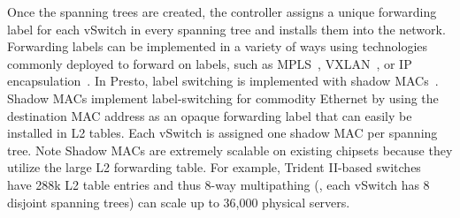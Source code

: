 Once the spanning trees are created, the controller assigns a unique forwarding label
for each vSwitch in every spanning tree and installs them into the network.
Forwarding labels can be implemented in a variety of ways using
technologies commonly deployed to forward on labels,
such as MPLS~\cite{casado2012fabric}, VXLAN~\cite{conga,nv-mtd}, or IP encapsulation~\cite{drb}. 
In Presto,
label switching is implemented with shadow MACs~\cite{shadow-mac}. 
Shadow MACs implement label-switching for commodity Ethernet by using the 
destination MAC address as an opaque forwarding label that can easily be 
installed in L2 tables. 
Each vSwitch is assigned one shadow MAC per spanning tree.
Note Shadow MACs are extremely scalable on
existing chipsets because they utilize the large L2 forwarding table. For example,
Trident II-based switches~\cite{trident2,smart-table,arista} have 288k L2 table entries and 
thus 8-way multipathing (\ie{}, each vSwitch has 8 disjoint spanning trees)
can scale up to 36,000 physical servers.

%



